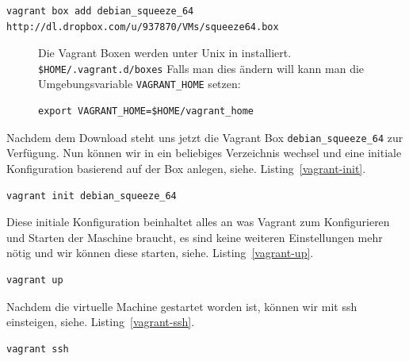 \documentclass[12pt,a4paper,ngerman]{article}
\newcommand{\reflst}[1]{, siehe. Listing~\ref{#1}}
\begin{document}
\begin{lstlisting}[caption=Download der Vagrant Box, label=vagrant-add]
vagrant box add debian_squeeze_64 http://dl.dropbox.com/u/937870/VMs/squeeze64.box
\end{lstlisting}

\begin{figure}
\vspace{-20pt}
\begin{boxedminipage}{4.5cm}
 Die Vagrant Boxen werden unter Unix in installiert. \lstinline!$HOME/.vagrant.d/boxes!
Falls man dies ändern will kann man die Umgebungsvariable \lstinline$VAGRANT_HOME$ setzen:
\begin{lstlisting}[label=vagrant-home,frame=none,numbers=none]
export VAGRANT_HOME=$HOME/vagrant_home
\end{lstlisting}
\end{boxedminipage}
\vspace{-20pt}
\end{figure}
 

Nachdem dem Download steht uns jetzt die  Vagrant Box \lstinline$debian_squeeze_64$ zur Verfügung. Nun können wir in ein beliebiges Verzeichnis wechsel und eine initiale Konfiguration basierend auf der Box anlegen\reflst{vagrant-init}.

\begin{lstlisting}[caption=Vagrant initialisieren, label=vagrant-init]
vagrant init debian_squeeze_64
\end{lstlisting}

Diese initiale Konfiguration beinhaltet alles an was Vagrant zum Konfigurieren und Starten der Maschine braucht, es sind keine weiteren Einstellungen mehr nötig und wir können diese starten\reflst{vagrant-up}.

\begin{lstlisting}[caption=Starten der Vagrant Maschine, label=vagrant-up]
vagrant up
\end{lstlisting}

Nachdem die virtuelle Machine gestartet worden ist, können wir mit ssh einsteigen\reflst{vagrant-ssh}.
\begin{lstlisting}[caption=Mit ssh in der Vagrant Maschine einsteigen, label=vagrant-ssh]
vagrant ssh
\end{lstlisting}
 
\end{document}
